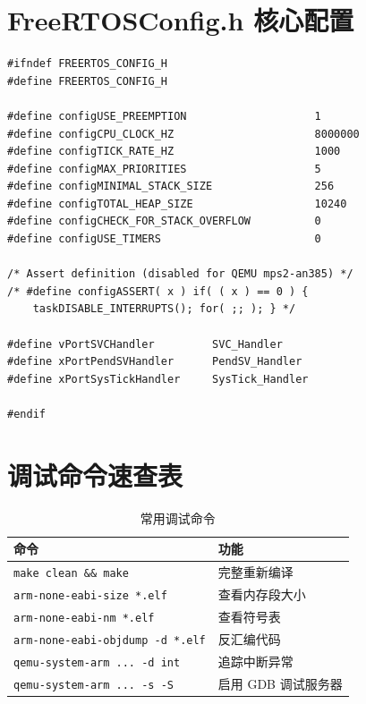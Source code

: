 \documentclass[12pt,a4paper]{ctexart}
\begin{document}
\newpage
\appendix
\section{FreeRTOSConfig.h 核心配置}

\begin{lstlisting}[caption={FreeRTOSConfig.h 核心配置项}]
#ifndef FREERTOS_CONFIG_H
#define FREERTOS_CONFIG_H

#define configUSE_PREEMPTION                    1
#define configCPU_CLOCK_HZ                      8000000
#define configTICK_RATE_HZ                      1000
#define configMAX_PRIORITIES                    5
#define configMINIMAL_STACK_SIZE                256
#define configTOTAL_HEAP_SIZE                   10240
#define configCHECK_FOR_STACK_OVERFLOW          0
#define configUSE_TIMERS                        0

/* Assert definition (disabled for QEMU mps2-an385) */
/* #define configASSERT( x ) if( ( x ) == 0 ) { 
    taskDISABLE_INTERRUPTS(); for( ;; ); } */

#define vPortSVCHandler         SVC_Handler
#define xPortPendSVHandler      PendSV_Handler
#define xPortSysTickHandler     SysTick_Handler

#endif
\end{lstlisting}

\section{调试命令速查表}

\begin{table}[H]
\centering
\caption{常用调试命令}
\begin{tabular}{lp{8cm}}
\toprule
\textbf{命令} & \textbf{功能} \\
\midrule
\texttt{make clean \&\& make} & 完整重新编译 \\
\texttt{arm-none-eabi-size *.elf} & 查看内存段大小 \\
\texttt{arm-none-eabi-nm *.elf} & 查看符号表 \\
\texttt{arm-none-eabi-objdump -d *.elf} & 反汇编代码 \\
\texttt{qemu-system-arm ... -d int} & 追踪中断异常 \\
\texttt{qemu-system-arm ... -s -S} & 启用 GDB 调试服务器 \\
\bottomrule
\end{tabular}
\end{table}
\end{document}
